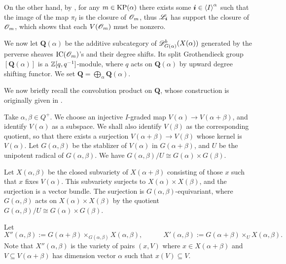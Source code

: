On the other hand, by \cite[Theorem 2.2]{Re},
for any $m\in\operatorname{KP}(\alpha)$ there exists some $\boldsymbol{i}\in\left<I\right>^\alpha$
such that the image of the map $\pi_{\ii}$ is
the closure of $\mathscr{O}_m$, thus $\mathscr{L}_{\boldsymbol{i}}$ has support
the closure of $\mathscr{O}_m$, which shows that each $V(\mathscr{O}_m)$ must be nonzero.

We now let $\mathbf{Q}(\alpha)$ be the additive subcategory
of $\mathscr{D}_{G(\alpha)}^b(X(\alpha))$ generated by the perverse sheaves
$\mathrm{IC}(\mathscr{O}_m)$'s and their degree shifts. Its split Grothendieck group
$[\mathbf{Q}(\alpha)]$ is a $\mathbb{Z}[q,q^{-1}]$-module,
where $q$ acts on $\mathbf{Q}(\alpha)$ by upward degree shifting functor.
We set $\mathbf{Q} = \bigoplus_\alpha\mathbf{Q}(\alpha)$.

We now briefly recall the convolution product on $\mathbf{Q}$,
whose construction is originally given in \cite{L}.

Take $\alpha,\beta\in Q^+$. We choose an injective $I$-graded map
$V(\alpha)\to V(\alpha+\beta)$, and identify $V(\alpha)$ as a subspace.
We shall also identify $V(\beta)$ as the corresponding quotient,
so that there exists a surjection $V(\alpha+\beta)\to V(\beta)$
whose kernel is $V(\alpha)$. Let $G(\alpha,\beta)$
be the stablizer of $V(\alpha)$ in $G(\alpha+\beta)$, and $U$ be
the unipotent radical of $G(\alpha,\beta)$. We have $G(\alpha,\beta)/U\cong G(\alpha)\times G(\beta)$.

Let $X(\alpha,\beta)$ be the closed subvariety of $X(\alpha+\beta)$ consisting of 
those $x$ such that $x$ fixes $V(\alpha)$. This subvariety
surjects to $X(\alpha)\times X(\beta)$, and the surjection
is a vector bundle. The surjection is $G(\alpha,\beta)$-equivariant, 
where $G(\alpha,\beta)$ acts on $X(\alpha)\times X(\beta)$
by the quotient $G(\alpha,\beta)/U\cong G(\alpha)\times G(\beta)$.

Let 
\[
    X''(\alpha,\beta) := G(\alpha+\beta)\times_{G(\alpha,\beta)}X(\alpha,\beta),
    \hspace{3em}X'(\alpha,\beta) := G(\alpha+\beta)\times_{U}X(\alpha,\beta).
\]    
Note that $X''(\alpha,\beta)$ is the variety of pairs $(x,V)$
where $x\in X(\alpha+\beta)$ and $V\subseteq V(\alpha+\beta)$
has dimension vector $\alpha$ such that $x(V)\subseteq V$.

